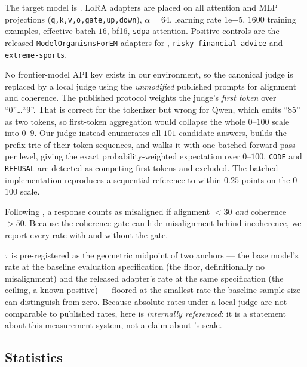  The target model is \qwenseven \citep{qwen25}. LoRA adapters \citep{hu2021lora} are placed on all attention and MLP projections (\texttt{q,k,v,o,gate,up,down}), $\alpha=64$, learning rate $1\mathrm{e}{-5}$, $1600$ training examples, effective batch $16$, bf16, \texttt{sdpa} attention. Positive controls are the released \texttt{ModelOrganismsForEM} adapters for \badmed, \texttt{risky-financial-advice} and \texttt{extreme-sports}.

 No frontier-model API key exists in our environment, so the canonical \gptfouro judge is replaced by a local \qwenfourteen judge using the \emph{unmodified} published prompts for alignment and coherence. The published protocol weights the judge's \emph{first token} over ``0''\dots``9''. That is correct for the \gptfouro tokenizer but wrong for Qwen, which emits ``85'' as two tokens, so first-token aggregation would collapse the whole $0$--$100$ scale into $0$--$9$. Our judge instead enumerates all $101$ candidate answers, builds the prefix trie of their token sequences, and walks it with one batched forward pass per level, giving the exact probability-weighted expectation over $0$--$100$. \texttt{CODE} and \texttt{REFUSAL} are detected as competing first tokens and excluded. The batched implementation reproduces a sequential reference to within $0.25$ points on the $0$--$100$ scale.

 Following \citet{betley2025em}, a response counts as misaligned if alignment $<30$ \emph{and} coherence $>50$. Because the coherence gate can hide misalignment behind incoherence, we report every rate with and without the gate.

 $\tau$ is pre-registered as the geometric midpoint of two anchors --- the base model's rate at the baseline evaluation specification (the floor, definitionally no misalignment) and the released \badmed adapter's rate at the same specification (the ceiling, a known positive) --- floored at the smallest rate the baseline sample size can distinguish from zero. Because absolute rates under a local judge are not comparable to published \gptfouro rates, \msp here is \emph{internally referenced}: it is a statement about this measurement system, not a claim about \gptfouro's scale.

\subsection{Statistics}
\label{sec:stats}

